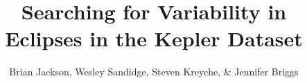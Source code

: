 \documentclass[manuscript]{aastex}
\begin{document}

\title{Searching for Variability in Eclipses in the Kepler Dataset}


\author{Brian Jackson, Wesley Sandidge, Steven Kreyche, \& Jennifer Briggs}




\begin{abstract}

\end{abstract}


\keywords{}

\end{document}
